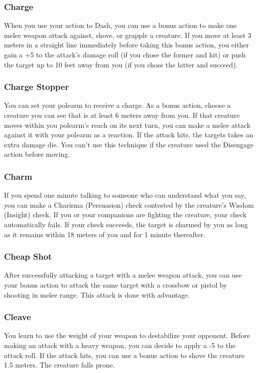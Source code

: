 \subsubsection{Charge} \label{tec::charge}
When you use your action to Dash, you can use a bonus action to make one melee weapon attack against, shove, or grapple a creature.
If you move at least 3 meters in a straight line immediately before taking this bonus action, you either gain a +5 to the attack's damage roll (if you chose the former and hit) or push the target up to 10 feet away from you (if you chose the latter and succeed).

\subsubsection{Charge Stopper} \label{tec::chargestopper}
You can set your polearm to receive a charge.
As a bonus action, choose a creature you can see that is at least 6 meters away from you.
If that creature moves within you polearm's reach on its next turn, you can make a melee attack against it with your polearm as a reaction.
If the attack hits, the targets takes an extra damage die.
You can't use this technique if the creature used the Disengage action before moving.

\subsubsection{Charm} \label{tec::charm}
If you spend one minute talking to someone who can understand what you say, you can make a Charisma (Persuasion) check contested by the creature's Wisdom (Insight) check.
If you or your companions are fighting the creature, your check automatically fails.
If your check succeeds, the target is charmed by you as long as it remains within 18 meters of you and for 1 minute thereafter.

\subsubsection{Cheap Shot} \label{tec::cheapshot}
After successfully attacking a target with a melee weapon attack, you can use your bonus action to attack the same target with a crossbow or pistol by shooting in melee range.
This attack is done with advantage.

\subsubsection{Cleave} \label{tec::cleave}
You learn to use the weight of your weapon to destabilize your opponent.
Before making an attack with a heavy weapon, you can decide to apply a -5 to the attack roll.
If the attack hits, you can use a bonus action to shove the creature 1.5 meters.
The creature falls prone.


